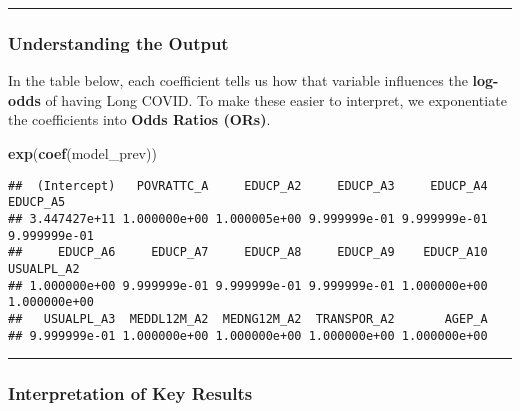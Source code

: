 \documentclass[
]{article}
\newenvironment{Shaded}{\begin{snugshade}}{\end{snugshade}}
\newcommand{\FunctionTok}[1]{\textcolor[rgb]{0.13,0.29,0.53}{\textbf{#1}}}
\newcommand{\NormalTok}[1]{#1}
\begin{document}
\begin{center}\rule{0.5\linewidth}{0.5pt}\end{center}

\subsubsection{Understanding the Output}\label{understanding-the-output}

In the table below, each coefficient tells us how that variable
influences the \textbf{log-odds} of having Long COVID. To make these
easier to interpret, we exponentiate the coefficients into \textbf{Odds
Ratios (ORs)}.

\begin{Shaded}
\begin{Highlighting}[]
\FunctionTok{exp}\NormalTok{(}\FunctionTok{coef}\NormalTok{(model\_prev))}
\end{Highlighting}
\end{Shaded}

\begin{verbatim}
##  (Intercept)   POVRATTC_A     EDUCP_A2     EDUCP_A3     EDUCP_A4     EDUCP_A5 
## 3.447427e+11 1.000000e+00 1.000005e+00 9.999999e-01 9.999999e-01 9.999999e-01 
##     EDUCP_A6     EDUCP_A7     EDUCP_A8     EDUCP_A9    EDUCP_A10   USUALPL_A2 
## 1.000000e+00 9.999999e-01 9.999999e-01 9.999999e-01 1.000000e+00 1.000000e+00 
##   USUALPL_A3  MEDDL12M_A2  MEDNG12M_A2  TRANSPOR_A2       AGEP_A 
## 9.999999e-01 1.000000e+00 1.000000e+00 1.000000e+00 1.000000e+00
\end{verbatim}

\begin{center}\rule{0.5\linewidth}{0.5pt}\end{center}

\subsubsection{Interpretation of Key
Results}\label{interpretation-of-key-results}
\end{document}
